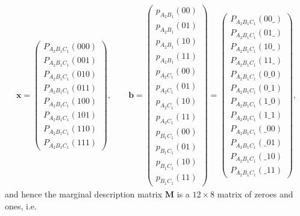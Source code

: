\documentclass[aps,english,10pt,superscriptaddress,onecolumn,twoside,longbibliography,pra,floatfix,fleqn,nofootinbib]{revtex4-1}
\theoremstyle{definition}
\begin{document}
\begin{align}
\bm{x}=\begin{pmatrix}
 P_{A_2 B_1 C_1}(0 0 0) \\
 P_{A_2 B_1 C_1}(0 0 1) \\
 P_{A_2 B_1 C_1}(0 1 0) \\
 P_{A_2 B_1 C_1}(0 1 1) \\
 P_{A_2 B_1 C_1}(1 0 0) \\
 P_{A_2 B_1 C_1}(1 0 1) \\
 P_{A_2 B_1 C_1}(1 1 0) \\
 P_{A_2 B_1 C_1}(1 1 1)
\end{pmatrix}
,\qquad
\bm{b}=
\begin{pmatrix}
 p_{A_2 B_1}(0 0) \\
 p_{A_2 B_1}(0 1) \\
 p_{A_2 B_1}(1 0) \\
 p_{A_2 B_1}(1 1) \\
 p_{A_2 C_1}(0 0) \\
 p_{A_2 C_1}(0 1) \\
 p_{A_2 C_1}(1 0) \\
 p_{A_2 C_1}(1 1) \\
 p_{B_1 C_1}(0 0) \\
 p_{B_1 C_1}(0 1) \\
 p_{B_1 C_1}(1 0) \\
 p_{B_1 C_1}(1 1)
\end{pmatrix}=
\begin{pmatrix}
 P_{A_2 B_1 C_1}(0 0 \_) \\
 P_{A_2 B_1 C_1}(0 1 \_) \\
 P_{A_2 B_1 C_1}(1 0 \_) \\
 P_{A_2 B_1 C_1}(1 1 \_) \\
 P_{A_2 B_1 C_1}(0 \_ 0) \\
 P_{A_2 B_1 C_1}(0 \_ 1) \\
  P_{A_2 B_1 C_1}(1 \_ 0) \\
 P_{A_2 B_1 C_1}(1 \_ 1) \\
 P_{A_2 B_1 C_1}(\_ 0 0) \\
 P_{A_2 B_1 C_1}(\_ 0 1) \\
 P_{A_2 B_1 C_1}(\_ 1 0) \\
 P_{A_2 B_1 C_1}(\_ 1 1) 
\end{pmatrix},
\end{align}
and hence the marginal description matrix $\bm{M}$ is a $12\times 8$ matrix of zeroes and ones, i.e.
\end{document}
